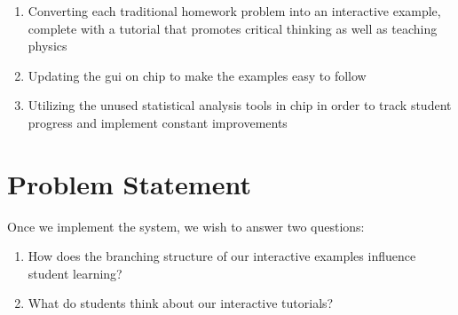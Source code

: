 \begin{enumerate}
\item Converting each traditional homework problem into an interactive example, complete with a tutorial that promotes critical thinking as well as teaching physics
\item Updating the \gls{gui} on \gls{chip} to make the examples easy to follow
\item Utilizing the unused statistical analysis tools in \gls{chip} in order to track student progress and implement constant improvements
\end{enumerate}

\section{Problem Statement}

Once we implement the system, we wish to answer two questions:

\begin{enumerate}
\item How does the branching structure of our interactive examples influence student learning?
\item What do students think about our interactive tutorials?
\end{enumerate}
